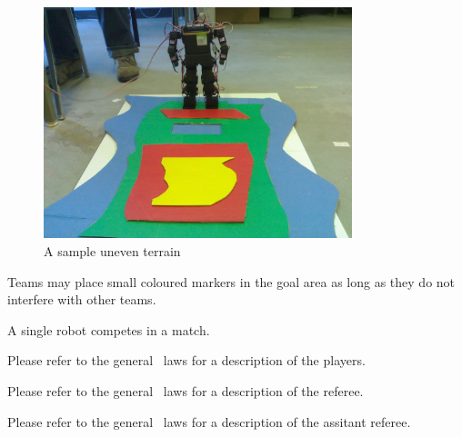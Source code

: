 \documentclass[12pt]{hurocup}
\begin{document}
\begin{lawlist}[LC]
  \begin{figure}
    \begin{center}
      \includegraphics[width=0.8\textwidth]{Figures/uneven-terrain}
    \end{center}
    \caption{A sample uneven terrain}
    \label{fig:uneven-terrain}
  \end{figure}

\item Teams may place small coloured markers in the goal area as long
  as they do not interfere with other teams.

\end{lawlist}


\begin{lawlist}[LC]
\item A single robot competes in a match.
\end{lawlist}


Please refer to the general \HuroCup\ laws for a description of
the players.


Please refer to the general \HuroCup\ laws for a description of
the referee.


Please refer to the general \HuroCup\ laws for a description of
the assitant referee.

\end{document}
